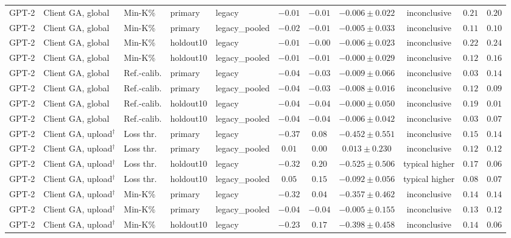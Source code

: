 \begin{table}[t]
\begin{tabular*}{\textwidth}{@{\extracolsep{\fill}}lllllcccccc@{}}
GPT-2 & Client GA, global & Min-K\% & primary & legacy & $-0.01$ & $-0.01$ & $-0.006 \pm 0.022$ & inconclusive & $0.21$ & $0.20$ \\
GPT-2 & Client GA, global & Min-K\% & primary & legacy\_pooled & $-0.02$ & $-0.01$ & $-0.005 \pm 0.033$ & inconclusive & $0.11$ & $0.10$ \\
GPT-2 & Client GA, global & Min-K\% & holdout10 & legacy & $-0.01$ & $-0.00$ & $-0.006 \pm 0.023$ & inconclusive & $0.22$ & $0.24$ \\
GPT-2 & Client GA, global & Min-K\% & holdout10 & legacy\_pooled & $-0.01$ & $-0.01$ & $-0.000 \pm 0.029$ & inconclusive & $0.12$ & $0.16$ \\
GPT-2 & Client GA, global & Ref.-calib. & primary & legacy & $-0.04$ & $-0.03$ & $-0.009 \pm 0.066$ & inconclusive & $0.03$ & $0.14$ \\
GPT-2 & Client GA, global & Ref.-calib. & primary & legacy\_pooled & $-0.04$ & $-0.03$ & $-0.008 \pm 0.016$ & inconclusive & $0.12$ & $0.09$ \\
GPT-2 & Client GA, global & Ref.-calib. & holdout10 & legacy & $-0.04$ & $-0.04$ & $-0.000 \pm 0.050$ & inconclusive & $0.19$ & $0.01$ \\
GPT-2 & Client GA, global & Ref.-calib. & holdout10 & legacy\_pooled & $-0.04$ & $-0.04$ & $-0.006 \pm 0.042$ & inconclusive & $0.03$ & $0.07$ \\
GPT-2 & Client GA, upload$^{\dagger}$ & Loss thr. & primary & legacy & $-0.37$ & $0.08$ & $-0.452 \pm 0.551$ & inconclusive & $0.15$ & $0.14$ \\
GPT-2 & Client GA, upload$^{\dagger}$ & Loss thr. & primary & legacy\_pooled & $0.01$ & $0.00$ & $0.013 \pm 0.230$ & inconclusive & $0.12$ & $0.12$ \\
GPT-2 & Client GA, upload$^{\dagger}$ & Loss thr. & holdout10 & legacy & $-0.32$ & $0.20$ & $-0.525 \pm 0.506$ & typical higher & $0.17$ & $0.06$ \\
GPT-2 & Client GA, upload$^{\dagger}$ & Loss thr. & holdout10 & legacy\_pooled & $0.05$ & $0.15$ & $-0.092 \pm 0.056$ & typical higher & $0.08$ & $0.07$ \\
GPT-2 & Client GA, upload$^{\dagger}$ & Min-K\% & primary & legacy & $-0.32$ & $0.04$ & $-0.357 \pm 0.462$ & inconclusive & $0.14$ & $0.14$ \\
GPT-2 & Client GA, upload$^{\dagger}$ & Min-K\% & primary & legacy\_pooled & $-0.04$ & $-0.04$ & $-0.005 \pm 0.155$ & inconclusive & $0.13$ & $0.12$ \\
GPT-2 & Client GA, upload$^{\dagger}$ & Min-K\% & holdout10 & legacy & $-0.23$ & $0.17$ & $-0.398 \pm 0.458$ & inconclusive & $0.14$ & $0.06$ \\

\end{tabular*}
\end{table}
